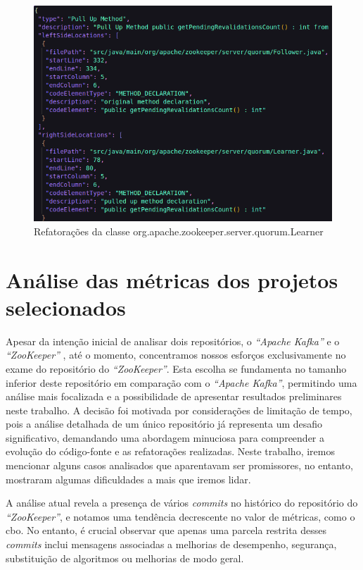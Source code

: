 \begin{figure}[h]
    \centering
    \includegraphics[width=0.8\linewidth]{figuras/Output/RefactoringMiner/org.apache.zookeeper.server.quorum.Learner.png}
    \caption{Refatorações da classe org.apache.zookeeper.server.quorum.Learner}
    \label{fig:RefactoringMinerOutput}
\end{figure}

\section{Análise das métricas dos projetos selecionados}
Apesar da intenção inicial de analisar dois repositórios, o \textit{``Apache Kafka''} \cite{KafkaGitHub} e o \textit{``ZooKeeper''} \cite{ZookeeperGitHub}, até o momento, concentramos nossos esforços exclusivamente no exame do repositório do \textit{``ZooKeeper''}. Esta escolha se fundamenta no tamanho inferior deste repositório em comparação com o \textit{``Apache Kafka''}, permitindo uma análise mais focalizada e a possibilidade de apresentar resultados preliminares neste trabalho. A decisão foi motivada por considerações de limitação de tempo, pois a análise detalhada de um único repositório já representa um desafio significativo, demandando uma abordagem minuciosa para compreender a evolução do código-fonte e as refatorações realizadas.  Neste trabalho, iremos mencionar alguns casos analisados que aparentavam ser promissores, no entanto, mostraram algumas dificuldades a mais que iremos lidar.

A análise atual revela a presença de vários \textit{commits} no histórico do repositório do \textit{``ZooKeeper''}, e notamos uma tendência decrescente no valor de métricas, como o \gls{cbo}. No entanto, é crucial observar que apenas uma parcela restrita desses \textit{commits} inclui mensagens associadas a melhorias de desempenho, segurança, substituição de algoritmos ou melhorias de modo geral. 

